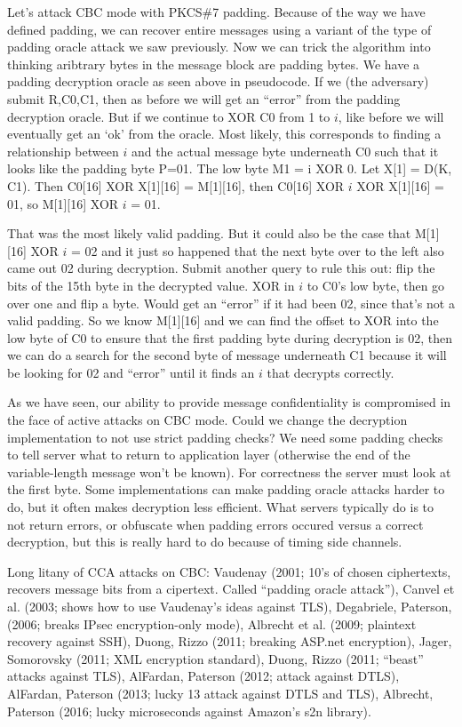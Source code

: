 Let's attack CBC mode with PKCS\#7 padding. Because of the way we have defined padding, we can recover entire messages using a variant of the type of padding oracle attack we saw previously. Now we can trick the algorithm into thinking aribtrary bytes in the message block are padding bytes.
We have a padding decryption oracle as seen above in pseudocode. If we (the adversary) submit R,C0,C1, then as before we will get an ``error'' from the padding decryption oracle. But if we continue to XOR C0 from 1 to $i$, like before we will eventually get an `ok' from the oracle. Most likely, this corresponds to finding a relationship between $i$ and the actual message byte underneath C0 such that it looks like the padding byte P=01.
The low byte M1 = i XOR 0.  
Let X[1] = D(K, C1). Then C0[16] XOR X[1][16] = M[1][16], then C0[16] XOR $i$ XOR X[1][16] = 01, so M[1][16] XOR $i$ = 01.

That was the most likely valid padding. But it could also be the case that M[1][16] XOR $i$ = 02 and it just so happened that the next byte over to the left also came out 02 during decryption. Submit another query to rule this out: flip the bits of the 15th byte in the decrypted value. XOR in $i$ to C0's low byte, then go over one and flip a byte. Would get an ``error'' if it had been 02, since that's not a valid padding.
So we know M[1][16] and we can find the offset to XOR into the low byte of C0 to ensure that the first padding byte during decryption is 02, then we can do a search for the second byte of message underneath C1 because it will be looking for 02 and ``error'' until it finds an $i$ that decrypts correctly. 

As we have seen, our ability to provide message confidentiality is compromised in the face of active attacks on CBC mode. Could we change the decryption implementation to not use strict padding checks? We need some padding checks to tell server what to return to application layer (otherwise the end of the variable-length message won't be known). For correctness the server must look at the first byte. Some implementations can make padding oracle attacks harder to do, but it often makes decryption less efficient. What servers typically do is to not return errors, or obfuscate when padding errors occured versus a correct decryption, but this is really hard to do because of timing side channels.

Long litany of CCA attacks on CBC: Vaudenay (2001; 10's of chosen ciphertexts, recovers message bits from a cipertext. Called ``padding oracle attack''), Canvel et al. (2003; shows how to use Vaudenay's ideas against TLS), Degabriele,
Paterson, (2006; breaks IPsec encryption-only mode), Albrecht et al. (2009; plaintext recovery against SSH), Duong, Rizzo (2011; breaking ASP.net encryption), Jager, Somorovsky (2011; XML encryption standard), Duong, Rizzo (2011; ``beast'' attacks against TLS), AlFardan, Paterson (2012; attack against DTLS), AlFardan, Paterson (2013; lucky 13 attack against DTLS and TLS), Albrecht, Paterson (2016; lucky microseconds against Amazon's s2n library).


